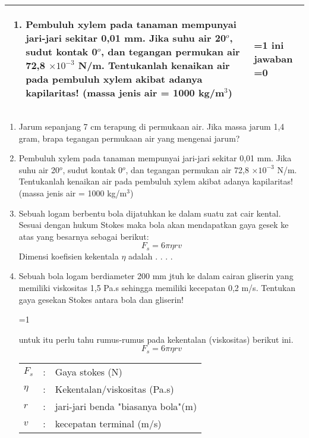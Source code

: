 \documentclass[14pt,a4paper]{extarticle}
\def\tampilkunci{1}
\newcommand{\hide}[1]{\ifnum\tampilkunci=1
%
\begin{mybox}
 #1
\end{mybox}
%
\vspace{\baselineskip}\fi}
\newcommand{\hidebox}[2]{\ifnum\tampilkunci=1
%
 #2
%
\vspace{\baselineskip}\fi\ifnum\tampilkunci=0
%
\vspace{#1cm}\fi}
\newcommand{\sci}[1]{$\times 10^{#1}$}
\newcommand{\baris}[1]{\renewcommand\arraystretch{#1} }
\begin{document}
  \setlength\itemsep{0em}

\baris{1}
\begin{tabular}{|p{8cm}|p{8cm}|}
\hline 
\begin{enumerate}[topsep=0mm, leftmargin=*,itemsep=0mm]
\item Pembuluh xylem pada tanaman mempunyai jari-jari sekitar 0,01 mm. Jika suhu air 20$^o$, sudut kontak 0$^o$, dan tegangan permukan air 72,8 \sci{-3} N/m. Tentukanlah kenaikan air pada pembuluh xylem akibat adanya kapilaritas! (massa jenis air  = 1000 kg/m$^3$)

\end {enumerate} 
& 
\hidebox{1} { ini jawaban} \\ \hline
\end{tabular}
%
\begin{enumerate}[itemsep=0mm]

\item Jarum sepanjang 7 cm terapung di permukaan air. Jika massa jarum 1,4 gram, brapa tegangan permukaan air yang mengenai jarum?


\item Pembuluh xylem pada tanaman mempunyai jari-jari sekitar 0,01 mm. Jika suhu air 20$^o$, sudut kontak 0$^o$, dan tegangan permukan air 72,8 \sci{-3} N/m. Tentukanlah kenaikan air pada pembuluh xylem akibat adanya kapilaritas! (massa jenis air  = 1000 kg/m$^3$)

\item Sebuah logam berbentu bola dijatuhkan ke dalam suatu zat cair kental. Sesuai dengan hukum Stokes maka bola akan mendapatkan gaya gesek ke atas yang besarnya sebagai berikut:
$$ F_s = 6 \pi \eta r v $$
Dimensi koefisien kekentala $\eta$ adalah . . . .

 

\item Sebuah bola logam berdiameter 200 mm jtuh ke dalam cairan gliserin yang memiliki viskositas 1,5 Pa.s sehingga memiliki kecepatan 0,2 m/s. Tentukan gaya gesekan Stokes antara bola dan gliserin!

\hide{
untuk itu perlu tahu rumus-rumus pada kekentalan (viskositas) berikut ini.
$$F_s= 6 \pi \eta r v $$
\begin{tabular}{lcl}
$F_s$ &:& Gaya stokes (N) \\
$\eta$ &:& Kekentalan/viskositas (Pa.s)\\
$r$ &:& jari-jari benda "biasanya bola"(m) \\
$v$ &:& kecepatan terminal (m/s) \\
\end{tabular}

}
\end{enumerate}
\end{document}
